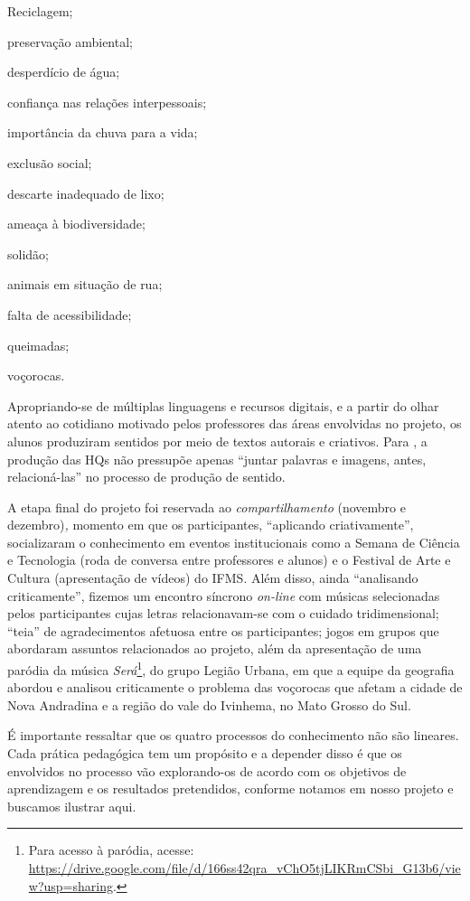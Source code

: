 \begin{enumerate*}[label=\arabic*)]
	\item Reciclagem;
	\item preservação ambiental;
	\item desperdício de água;
	\item confiança nas relações interpessoais;
	\item importância da chuva para a vida;
	\item exclusão social;
	\item descarte inadequado de lixo;
	\item ameaça à biodiversidade;
	\item solidão;
	\item animais em situação de rua;
	\item falta de acessibilidade;
	\item queimadas;
	\item voçorocas.
\end{enumerate*}

Apropriando-se de múltiplas linguagens e recursos digitais, e a partir do olhar atento ao cotidiano motivado pelos professores das áreas envolvidas no projeto, os alunos produziram sentidos por meio de textos autorais e criativos. Para \textcite[p. 307]{santos_letramento_2011}, a produção das HQs não pressupõe apenas “juntar palavras e imagens, antes, relacioná-las” no processo de produção de sentido.

A etapa final do projeto foi reservada ao \textit{compartilhamento }(novembro e dezembro)\textit{, }momento em que os participantes, “aplicando criativamente”, socializaram o conhecimento em eventos institucionais como a Semana de Ciência e Tecnologia (roda de conversa entre professores e alunos) e o Festival de Arte e Cultura (apresentação de vídeos) do IFMS. Além disso, ainda “analisando criticamente”, fizemos um encontro síncrono \textit{on-line} com músicas selecionadas pelos participantes cujas letras relacionavam-se com o cuidado tridimensional; “teia” de agradecimentos afetuosa entre os participantes; jogos em grupos que abordaram assuntos relacionados ao projeto, além da apresentação de uma paródia da música \textit{Será}\footnote{ Para acesso à paródia, acesse: \url{https://drive.google.com/file/d/166ss42qra_vChO5tjLIKRmCSbi_G13b6/view?usp=sharing}.}, do grupo Legião Urbana, em que a equipe da geografia abordou e analisou criticamente o problema das voçorocas que afetam a cidade de Nova Andradina e a região do vale do Ivinhema, no Mato Grosso do Sul.

É importante ressaltar que os quatro processos do conhecimento não são lineares. Cada prática pedagógica tem um propósito e a depender disso é que os envolvidos no processo vão explorando-os de acordo com os objetivos de aprendizagem e os resultados pretendidos, conforme notamos em nosso projeto e buscamos ilustrar aqui.
